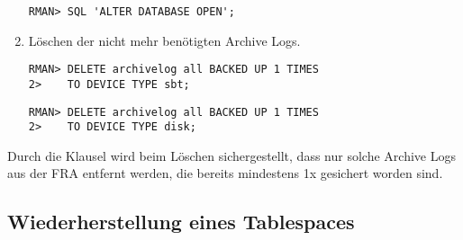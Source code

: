 \begin{enumerate}
\begin{lstlisting}[caption={Öffnen der Datenbank nach dem Recovery},label=admin1451,language=rman,emph={[10]ALTER,DATABASE,OPEN},emphstyle={[10]\color{magenta}\bfseries}]
RMAN> SQL 'ALTER DATABASE OPEN';
              \end{lstlisting}
            \item Löschen der nicht mehr benötigten Archive Logs.
              \begin{lstlisting}[caption={Löschen der Archive Logs, die bereits auf SBT-Tape gesichert wurden},label=admin1452,language=rman]
RMAN> DELETE archivelog all BACKED UP 1 TIMES
2>    TO DEVICE TYPE sbt;
              \end{lstlisting}
              \begin{lstlisting}[caption={Löschen der Archive Logs, die bereits auf Disk gesichert wurden},label=admin1453,language=rman]
RMAN> DELETE archivelog all BACKED UP 1 TIMES
2>    TO DEVICE TYPE disk;
              \end{lstlisting}
          \end{enumerate}
          Durch die Klausel  wird beim
          Löschen sichergestellt, dass nur solche Archive Logs aus der FRA entfernt werden, die bereits mindestens 1x gesichert worden sind.
      \subsection{Wiederherstellung eines Tablespaces}
